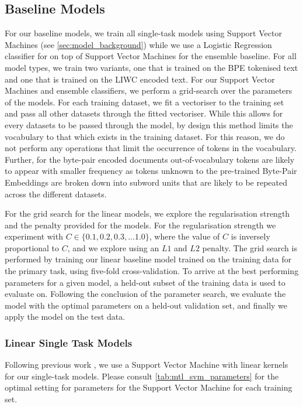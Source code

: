 \subsection{Baseline Models}

For our baseline models, we train all single-task models using Support Vector Machines (see \autoref{sec:model_background}) while we use a Logistic Regression classifier for on top of Support Vector Machines for the ensemble baseline. For all model types, we train two variants, one that is trained on the BPE tokenised text and one that is trained on the LIWC encoded text. For our Support Vector Machines and ensemble classifiers, we perform a grid-search over the parameters of the models. For each training dataset, we fit a vectoriser to the training set and pass all other datasets through the fitted vectoriser. While this allows for every datasets to be passed through the model, by design this method limits the vocabulary to that which exists in the training dataset. For this reason, we do not perform any operations that limit the occurrence of tokens in the vocabulary. Further, for the byte-pair encoded documents out-of-vocabulary tokens are likely to appear with smaller frequency as tokens unknown to the pre-trained Byte-Pair Embeddings are broken down into subword units that are likely to be repeated across the different datasets.

For the grid search for the linear models, we explore the regularisation strength and the penalty provided for the models. For the regularisation strength we experiment with $C\in \{0.1, 0.2, 0.3, \ldots 1.0\}$, where the value of $C$ is inversely proportional to $C$, and we explore using an $L1$ and $L2$ penalty. The grid search is performed by training our linear baseline model trained on the training data for the primary task, using five-fold cross-validation. To arrive at the best performing parameters for a given model, a held-out subset of the training data is used to evaluate on. Following the conclusion of the parameter search, we evaluate the model with the optimal parameters on a held-out validation set, and finally we apply the model on the test data.

\subsubsection{Linear Single Task Models}

Following previous work \cite{Waseem:2016,Davidson:2017}, we use a Support Vector Machine with linear kernels for our single-task models. Please consult \autoref{tab:mtl_svm_parameters} for the optimal setting for parameters for the Support Vector Machine for each training set.

